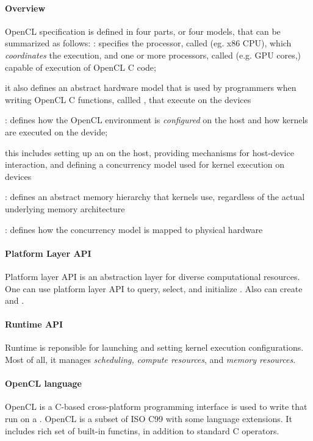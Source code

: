 \documentclass{memo}
\begin{document}
\small
{}

\paragraph{Overview}
OpenCL specification is defined in four parts, or four models, that can be
summarized as follows:
\bit
\w {}: specifies the processor, called  (eg. x86
CPU), which {\em   coordinates} the execution, and one or more processors,
called  (e.g. GPU cores,) 
capable of execution of OpenCL C code;

   it also defines an abstract hardware model that is used by programmers when
   writing OpenCL C functions, callled , that execute on the
   devices

\w {}: defines how the OpenCL environment is {\em
  configured\/}  on the host and how kernels are executed on the devide; 

this
includes setting up an  on the host, providing mechanisms
for host-device interaction, and defining a concurrency model used for kernel
execution on devices

\w {}: defines an abstract memory hierarchy that kernels use,
regardless of the actual underlying memory architecture

\w {}: defines how the concurrency model is mapped to
physical hardware
\eit




\paragraph{Platform Layer API}
Platform layer API is an abstraction layer for diverse computational
resources. One can use platform layer API to query, select, and initialize
. Also can create  and
. 

\paragraph{Runtime API}
Runtime is reponsible for launching  and setting kernel
execution configurations. Most of all, it manages {\em scheduling, compute
  resources\/}, and {\em memory resources\/}. 

\paragraph{OpenCL language}
OpenCL is a C-based cross-platform programming interface is used to write
 that run on a . 
OpenCL is a subset of ISO C99 with some language extensions. It includes rich
set of built-in functins, in addition to standard C operators.
\end{document}
